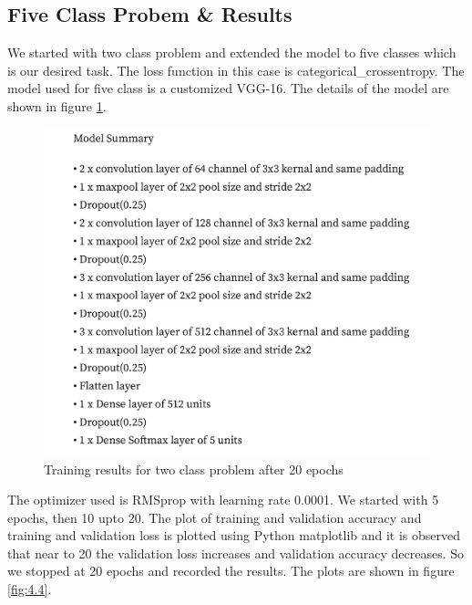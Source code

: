 \subsection{Five Class Probem \& Results}
We started with two class problem and extended the model to five classes
which is our desired task. The loss function in this case is categorical\_crossentropy.
The model used for five class is a customized VGG-16. The details of the
model are shown in figure \ref{model_summary}.
\begin{figure}[H]
    \centering
    \captionsetup{justification = centering}
    \includegraphics[scale = 0.8]{CHAPTERS/Chapter-4/Images/summary-01.jpg}
    \caption{Training results for two class problem after 20 epochs} 
    \label{model_summary}
\end{figure}
The optimizer used is RMSprop with
learning rate 0.0001. We started with 5 epochs, then 10 upto 20. The plot of training
and validation accuracy and training and validation loss is plotted using Python
matplotlib and it is observed that near to 20 the validation loss
increases and validation accuracy decreases. So we stopped at 20 epochs
and recorded the results. The plots are shown in
figure \ref{fig:4.4}.
